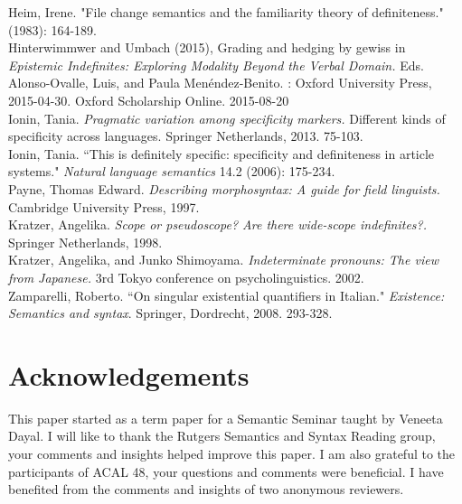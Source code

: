 \documentclass[output=paper,
modfonts
]{langsci/langscibook}
\begin{document}
Heim, Irene. "File change semantics and the familiarity theory of definiteness." (1983): 164-189.\\
Hinterwimmwer and  Umbach (2015), Grading and hedging by gewiss in \emph{Epistemic Indefinites: Exploring Modality Beyond the Verbal Domain.} Eds. Alonso-Ovalle, Luis, and Paula Menéndez-Benito. : Oxford University Press, 2015-04-30. Oxford Scholarship Online. 2015-08-20\\
Ionin, Tania. \emph{Pragmatic variation among specificity markers.} Different kinds of specificity across languages. Springer Netherlands, 2013. 75-103.\\
Ionin, Tania. ``This is definitely specific: specificity and definiteness in article systems." \emph{Natural language semantics} 14.2 (2006): 175-234.\\
Payne, Thomas Edward. \emph{Describing morphosyntax: A guide for field linguists.} Cambridge University Press, 1997.\\
Kratzer, Angelika. \emph{Scope or pseudoscope? Are there wide-scope indefinites?.} Springer Netherlands, 1998.
\\Kratzer, Angelika, and Junko Shimoyama. \emph{Indeterminate pronouns: The view from Japanese.} 3rd Tokyo conference on psycholinguistics. 2002.\\
Zamparelli, Roberto. ``On singular existential quantifiers in Italian." \emph{Existence: Semantics and syntax}. Springer, Dordrecht, 2008. 293-328.

\section*{Acknowledgements}
This paper started as a term paper for a Semantic Seminar taught by Veneeta Dayal. I will like to thank the Rutgers Semantics and Syntax Reading group, your comments and insights helped improve this paper. I am also grateful to the participants of  ACAL 48, your questions and comments were beneficial. I have benefited from the comments and insights of two anonymous reviewers. 
\end{document}
